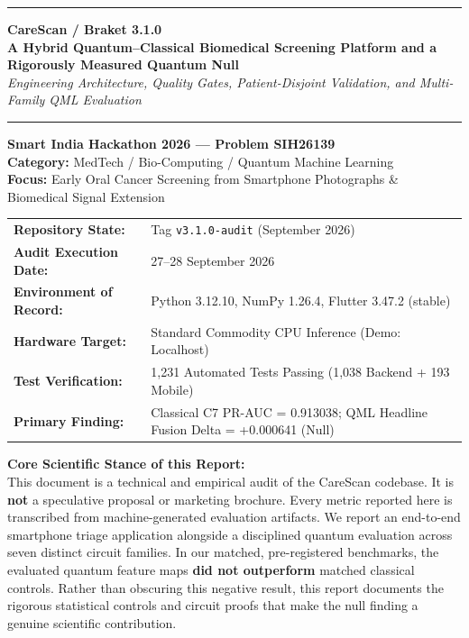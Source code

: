 \documentclass[11pt,a4paper]{report}
\begin{document}
\begin{titlepage}
\centering
\vspace*{1.0cm}

{\color{csteal}\rule{\textwidth}{2.0pt}}
\vspace{0.4cm}

{\Huge \bfseries \color{csteal} CareScan / Braket 3.1.0}\\[0.4cm]
{\Large \bfseries A Hybrid Quantum--Classical Biomedical Screening Platform and a Rigorously Measured Quantum Null}\\[0.2cm]
{\large \itshape Engineering Architecture, Quality Gates, Patient-Disjoint Validation, and Multi-Family QML Evaluation}

\vspace{0.4cm}
{\color{csteal}\rule{\textwidth}{1.0pt}}

\vspace{1.2cm}
\textbf{Smart India Hackathon 2026 --- Problem SIH26139}\\
\textbf{Category:} MedTech / Bio-Computing / Quantum Machine Learning\\
\textbf{Focus:} Early Oral Cancer Screening from Smartphone Photographs \& Biomedical Signal Extension

\vspace{1.5cm}
\begin{tabular}{ll}
\textbf{Repository State:} & Tag \texttt{v3.1.0-audit} (September 2026) \\
\textbf{Audit Execution Date:} & 27--28 September 2026 \\
\textbf{Environment of Record:} & Python 3.12.10, NumPy 1.26.4, Flutter 3.47.2 (stable) \\
\textbf{Hardware Target:} & Standard Commodity CPU Inference (Demo: Localhost) \\
\textbf{Test Verification:} & 1,231 Automated Tests Passing (1,038 Backend + 193 Mobile) \\
\textbf{Primary Finding:} & Classical C7 PR-AUC = 0.913038; QML Headline Fusion Delta = +0.000641 (Null)
\end{tabular}

\vspace{1.5cm}
\begin{minipage}{0.88\textwidth}
\small
\textbf{Core Scientific Stance of this Report:}\\
This document is a technical and empirical audit of the CareScan codebase. It is \textbf{not} a speculative proposal or marketing brochure. Every metric reported here is transcribed from machine-generated evaluation artifacts. We report an end-to-end smartphone triage application alongside a disciplined quantum evaluation across seven distinct circuit families. In our matched, pre-registered benchmarks, the evaluated quantum feature maps \textbf{did not outperform} matched classical controls. Rather than obscuring this negative result, this report documents the rigorous statistical controls and circuit proofs that make the null finding a genuine scientific contribution.
\end{minipage}


\end{titlepage}
\end{document}
